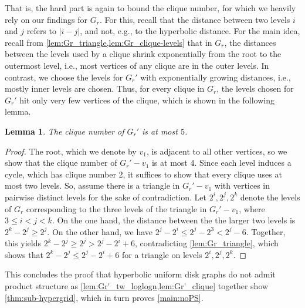 \documentclass[11pt]{article}
\newtheorem{lemma}[theorem]{Lemma}
\newcommand{\thomas}[1]{}
\newcommand{\Thomas}[1]{}
\begin{document}
\thomas{remark for shortening: I think we can just drop the previous sentence.}%
That is, the hard part is again to bound the clique number, for which we heavily rely on our findings for $ G_r $.
For this, recall that the distance between two levels $ i $ and $ j $ refers to $ |i - j| $, and not, e.g., to the hyperbolic distance.
%
For the main idea, recall from \cref{lem:Gr_triangle,lem:Gr_clique-levels} that in $ G_r $, the distances between the levels used by a clique shrink exponentially from the root to the outermost level, i.e., most vertices of any clique are in the outer levels.
In contrast, we choose the levels for $ G_r' $ with exponentially growing distances, i.e., mostly inner levels are chosen.
Thus, for every clique in $G_r$, the levels chosen for $G_r'$ hit only very few vertices of the clique, which is shown in the following lemma.
%
\begin{lemma}\label{lem:Gr'_clique}
    The clique number of $ G_r' $ is at most $5$.
\end{lemma}
%
\begin{proof}
    The root, which we denote by $ v_1 $, is adjacent to all other vertices, so we show that the clique number of $ G_r' - v_1 $ is at most 4.
    Since each level induces a cycle, which has clique number 2, it suffices to show that every clique uses at most two levels.
    So, assume there is a triangle in $ G_r' - v_1 $ with vertices in pairwise distinct levels for the sake of contradiction.
    Let $ 2^i, 2^j, 2^k $ denote the levels of $ G_r $ corresponding to the three levels of the triangle in $ G_r' - v_1 $, where $ 3 \leq i < j < k $.
    On the one hand, the distance between the the larger two levels is $ 2^k - 2^j \geq 2^j $.
    On the other hand, we have $ 2^j - 2^i \leq 2^j - 2^3 < 2^j - 6 $.
    Together, this yields $ 2^k - 2^j \geq 2^j > 2^j - 2^i + 6 $,
    contradicting \cref{lem:Gr_triangle}, which shows that $ 2^k - 2^j \leq 2^j - 2^i + 6 $ for a triangle on levels $ 2^i, 2^j, 2^k $.
\end{proof}
%
This concludes the proof that hyperbolic uniform disk graphs do not admit product structure as \cref{lem:Gr'_tw_loglogn,lem:Gr'_clique} together show \cref{thm:sub-hypergrid}, which in turn proves \cref{main:noPS}.
%
% 
\end{document}
